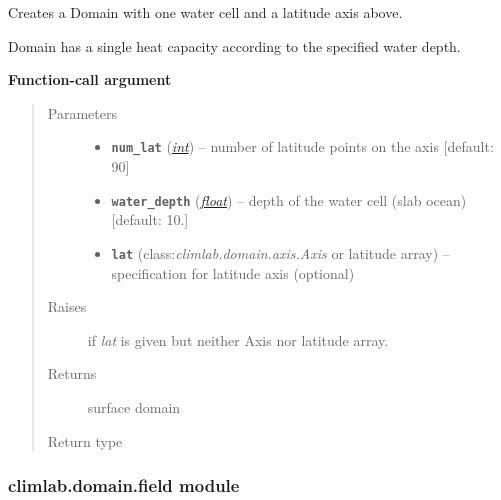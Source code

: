 \documentclass[letterpaper,10pt,english]{sphinxmanual}
\begin{document}
\begin{fulllineitems}
\label{api/climlab.domain:climlab.domain.domain.zonal_mean_surface}
Creates a Domain with one water cell and a latitude axis above.

Domain has a single heat capacity according to the specified water depth.

\textbf{Function-call argument}
\begin{quote}\begin{description}
\item[{Parameters}] \leavevmode\begin{itemize}
\item {} 
\textbf{\texttt{num\_lat}} (\href{http://docs.python.org/2.7/library/functions.html\#int}{\emph{int}}) -- number of latitude points on the axis
{[}default: 90{]}

\item {} 
\textbf{\texttt{water\_depth}} (\href{http://docs.python.org/2.7/library/functions.html\#float}{\emph{float}}) -- depth of the water cell (slab ocean) {[}default: 10.{]}

\item {} 
\textbf{\texttt{lat}} (class:\emph{climlab.domain.axis.Axis} or latitude array) -- specification for latitude axis (optional)

\end{itemize}

\item[{Raises}] \leavevmode
{}  if \emph{lat} is given but neither Axis nor latitude array.

\item[{Returns}] \leavevmode
surface domain

\item[{Return type}] \leavevmode
{\hyperref[api/climlab.domain:climlab.domain.domain.SlabOcean]{\emph{}}}

\end{description}\end{quote}

\end{fulllineitems}



\subsubsection{climlab.domain.field module}
\label{api/climlab.domain:climlab-domain-field-module}\label{api/climlab.domain:module-climlab.domain.field}
\end{document}
